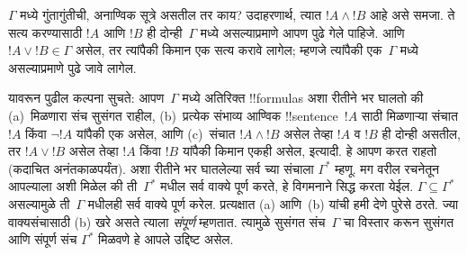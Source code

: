 \documentclass[../../../include/open-logic-section]{subfiles}
\begin{document}
$\Gamma$ मध्ये गुंतागुंतीची, अनाण्विक सूत्रे असतील तर काय? उदाहरणार्थ,
त्यात $!A \land !B$ आहे असे समजा. ते सत्य करण्यासाठी $!A$ आणि $!B$ ही
दोन्ही~$\Gamma$ मध्ये असल्याप्रमाणे आपण पुढे गेले पाहिजे. आणि $!A \lor
!B \in \Gamma$ असेल, तर त्यांपैकी किमान एक सत्य करावे लागेल; म्हणजे
त्यांपैकी एक~$\Gamma$ मध्ये असल्याप्रमाणे पुढे जावे लागेल.

यावरून पुढील कल्पना सुचते: आपण~$\Gamma$ मध्ये अतिरिक्त !!{formula}s
अशा रीतीने भर घालतो की (a)~मिळणारा संच सुसंगत राहील, (b)~प्रत्येक
संभाव्य आण्विक !!{sentence}~$!A$ साठी मिळणाऱ्या संचात $!A$ किंवा
$\lnot !A$ यांपैकी एक असेल, आणि (c)~संचात $!A \land !B$ असेल तेव्हा
$!A$ व $!B$ ही दोन्ही असतील, तर $!A \lor !B$ असेल तेव्हा $!A$ किंवा
$!B$ यांपैकी किमान एकही असेल, इत्यादी. हे आपण करत राहतो (कदाचित
अनंतकाळपर्यंत). अशा रीतीने भर घातलेल्या सर्व च्या संचाला
$\Gamma^*$ म्हणू. मग वरील रचनेतून आपल्याला अशी
मिळेल की ती~$\Gamma^*$ मधील सर्व वाक्ये पूर्ण करते, हे विगमनाने सिद्ध
करता येईल. $\Gamma \subseteq \Gamma^*$ असल्यामुळे ती~$\Gamma$ मधीलही
सर्व वाक्ये पूर्ण करेल. प्रत्यक्षात (a) आणि~(b) यांची हमी देणे पुरेसे
ठरते. ज्या वाक्यसंचासाठी (b) खरे असते त्याला \emph{संपूर्ण} म्हणतात.
त्यामुळे सुसंगत संच~$\Gamma$ चा विस्तार करून सुसंगत आणि संपूर्ण संच
$\Gamma^*$ मिळवणे हे आपले उद्दिष्ट असेल.
\end{document}
